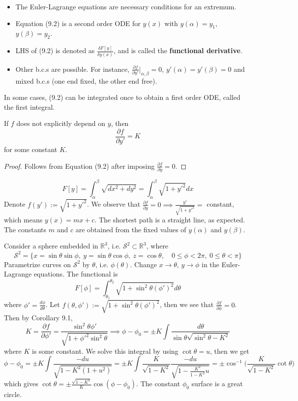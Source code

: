 \documentclass[a4paper]{article}
\begin{document}
\begin{remarks}\leavevmode
\begin{itemize}
    \item The Euler-Lagrange equations are necessary conditions for an extremum.
    \item Equation (9.2) is a second order ODE for $y(x)$ with $y(\alpha)=y_1$, $y(\beta)=y_2$.
    \item LHS of (9.2) is denoted as $\frac{\delta F[y]}{\delta y(x)}$, and is called the \textbf{functional derivative}.
    \item Other b.c.s are possible. For instance, $\frac{\partial f}{\partial y'}|_{\alpha,\beta}=0$, $y'(\alpha)=y'(\beta)=0$ and mixed b.c.s (one end fixed, the other end free).
\end{itemize}
\end{remarks}
In some cases, (9.2) can be integrated once to obtain a first order ODE, called the first integral.
\begin{cor}
If $f$ does not explicitly depend on $y$, then
\begin{equation}
\frac{\partial f}{\partial y'}=K\tag{9.3}
\end{equation}
for some constant $K$.
\end{cor}
\begin{proof}
Follows from Equation (9.2) after imposing $\frac{\partial f}{\partial y}=0$.
\end{proof}
\begin{eg}
$$F[y]=\int_\alpha^\beta\sqrt{dx^2+dy^2}=\int_\alpha^\beta\sqrt{1+y'^2}dx$$
Denote $f(y'):=\sqrt{1+y'^2}$. We observe that $\frac{\partial f}{\partial y}=0\implies\frac{y'}{\sqrt{1+y'^2}}=$ constant, which means $y(x)=mx+c$. The shortest path is a straight line, as expected. The constants $m$ and $c$ are obtained from the fixed values of $y(\alpha)$ and $y(\beta)$.
\end{eg}
\begin{eg}
Consider a sphere embedded in $\mathbb{R}^3$, i.e. $\mathcal{S}^2\subset\mathbb{R}^3$, where
$$\mathcal{S}^2=\{x=\sin\theta\sin\phi,~y=\sin\theta\cos\phi,~z=\cos\theta,\quad 0\leq\phi<2\pi,~0\leq\theta<\pi\}$$
Parametrize curves on $\mathcal{S}^2$ by $\theta$, i.e. $\phi(\theta)$. Change $x\rightarrow\theta$, $y\rightarrow\phi$ in the Euler-Lagrange equations. The functional is
$$F[\phi]=\int_{\theta_1}^{\theta_2}\sqrt{1+\sin^2\theta(\phi')^2}d\theta$$
where $\phi'=\frac{d\phi}{d\theta}$. Let $f(\theta,\phi'):=\sqrt{1+\sin^2\theta(\phi')^2}$, then we see that $\frac{\partial f}{\partial\phi}=0$. Then by Corollary 9.1,
$$K=\frac{\partial f}{\partial\phi'}=\frac{\sin^2\theta\phi'}{\sqrt{1+\phi'^2\sin^2\theta}}\implies\phi-\phi_0=\pm K\int\frac{d\theta}{\sin\theta\sqrt{\sin^2\theta-K^2}}$$
where $K$ is some constant. We solve this integral by using $\cot\theta=u$, then we get
$$\phi-\phi_0=\pm K\int\frac{-du}{\sqrt{1-K^2(1+u^2)}}=\pm K\int\frac{K}{\sqrt{1-K^2}}\frac{-du}{\sqrt{1-\frac{K^2}{1-K^2}u}}=\pm \cos^{-1}\bigg(\frac{K}{\sqrt{1-K^2}}\cot\theta\bigg)$$
which gives $\cot\theta=\pm\frac{\sqrt{1-K^2}}{K}\cos(\phi-\phi_0)$. The constant $\phi_0$ surface is a great circle.
\end{eg}
\end{document}
